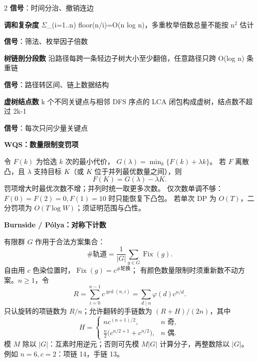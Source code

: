 \documentclass[UTF8,fontset=fandol,a4paper,twoside]{ctexart}
\newcommand{\topic}[1]{\par\smallskip\textbf{#1}\par\nobreak}
\begin{document}
\begin{multicols}{2}
\textbf{信号}：时间分治、撤销连边\par
\par\textbf{调和复杂度}\quad
\ensuremath{\Sigma}\_(\allowbreak{}i=\allowbreak{}1.\allowbreak{}.\allowbreak{}n)\allowbreak{} floor(\allowbreak{}n/\allowbreak{}i)\allowbreak{}=\allowbreak{}O(\allowbreak{}n log n)\allowbreak{}，多重枚举倍数总量不能按 n\ensuremath{^2} 估计\par
\textbf{信号}：筛法、枚举因子倍数\par
\par\textbf{树链剖分段数}\quad
沿路径每跨一条轻边子树大小至少翻倍，任意路径只跨 O(\allowbreak{}log n)\allowbreak{} 条重链\par
\textbf{信号}：路径转区间、链上数据结构\par
\par\textbf{虚树结点数}\quad
k 个不同关键点与相邻 DFS 序点的 LCA 闭包构成虚树，结点数不超过 2k-\allowbreak{}1\par
\textbf{信号}：每次只问少量关键点\par

\topic{WQS：数量限制变罚项}
令 $F(k)$ 为恰选 $k$ 次的最小代价，
$G(\lambda)=\min_k\{F(k)+\lambda k\}$。
若 $F$ 离散凸，且 $\lambda$ 支持目标 $K$（或 $K$ 位于并列最优数量之间），则
\[
F(K)=G(\lambda)-\lambda K.
\]
罚项增大时最优次数不增；并列时统一取更多次数。
仅次数单调不够：$F(0)=F(2)=0,F(1)=10$ 时只能恢复下凸包。
若单次 DP 为 $O(T)$，二分罚项为 $O(T\log W)$；须证明范围与凸性。
\topic{Burnside / P\'olya：对称下计数}
有限群 $G$ 作用于合法方案集合：
\[
\#\text{轨道}=\frac1{|G|}\sum_{g\in G}\operatorname{Fix}(g).
\]
自由用 $c$ 色染位置时，$\operatorname{Fix}(g)=c^{\#\text{轮换}}$；
有颜色数量限制时须重新数不动方案。$n\ge1$，令
\[
R=\sum_{i=0}^{n-1}c^{\gcd(n,i)}
=\sum_{d\mid n}\varphi(d)c^{n/d}.
\]
只认旋转的项链数为 $R/n$；允许翻转的手链数为 $(R+H)/(2n)$，其中
\[
H=\begin{cases}
nc^{(n+1)/2},&n\text{ 奇},\\
\frac n2\bigl(c^{n/2+1}+c^{n/2}\bigr),&n\text{ 偶}.
\end{cases}
\]
模 $M$ 除以 $|G|$：互素时用逆元；否则可先模 $M|G|$ 计算分子，再整数除以 $|G|$。
例如 $n=6,c=2$：项链 14，手链 13。


\end{multicols}
\end{document}
